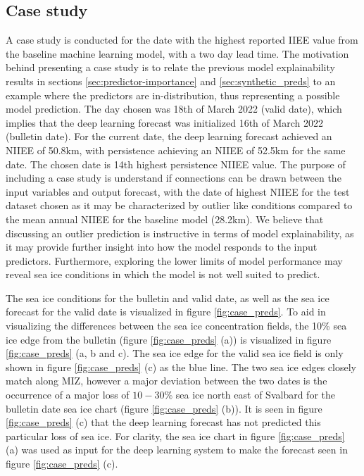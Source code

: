 \documentclass[../main/thesis.tex]{subfiles}
\begin{document}
\subsection{Case study}
A case study is conducted for the date with the highest reported IIEE value from the baseline machine learning model, with a two day lead time. The motivation behind presenting a case study is to relate the previous model explainability results in sections \ref{sec:predictor-importance} and \ref{sec:synthetic_preds} to an example where the predictors are in-distribution, thus representing a possible model prediction. The day chosen was 18th of March 2022 (valid date), which implies that the deep learning forecast was initialized 16th of March 2022 (bulletin date). For the current date, the deep learning forecast achieved an NIIEE of 50.8km, with persistence achieving an NIIEE of 52.5km for the same date. The chosen date is 14th highest persistence NIIEE value. The purpose of including a case study is understand if connections can be drawn between the input variables and output forecast, with the date of highest NIIEE for the test dataset chosen as it may be characterized by outlier like conditions compared to the mean annual NIIEE for the baseline model (28.2km). We believe that discussing an outlier prediction is instructive in terms of model explainability, as it may provide further insight into how the model responds to the input predictors. Furthermore, exploring the lower limits of model performance may reveal sea ice conditions in which the model is not well suited to predict.

The sea ice conditions for the bulletin and valid date, as well as the sea ice forecast for the valid date is visualized in figure \ref{fig:case_preds}. To aid in visualizing the differences between the sea ice concentration fields, the 10\% sea ice edge from the bulletin (figure \ref{fig:case_preds} (a)) is visualized in figure \ref{fig:case_preds} (a, b and c). The sea ice edge for the valid sea ice field is only shown in figure \ref{fig:case_preds} (c) as the blue line. The two sea ice edges closely match along MIZ, however a major deviation between the two dates is the occurrence of a major loss of $10-30\%$ sea ice north east of Svalbard for the bulletin date sea ice chart (figure \ref{fig:case_preds} (b)). It is seen in figure \ref{fig:case_preds} (c) that the deep learning forecast has not predicted this particular loss of sea ice. For clarity, the sea ice chart in figure \ref{fig:case_preds} (a) was used as input for the deep learning system to make the forecast seen in figure \ref{fig:case_preds} (c).
\end{document}
